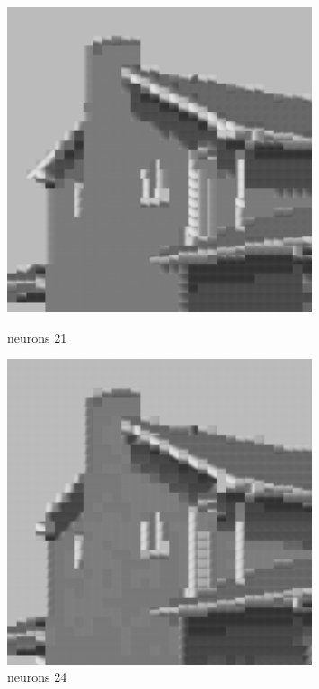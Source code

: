 \documentclass[../IDP_Task5_Karwowski_Kowalewski.tex]{subfiles}
\begin{document}
{{        \begin{figure}[!htbp]
            \begin{minipage}[c]{0.45\linewidth}
                \centering
                \includegraphics[width=0.8\textwidth]{img/kowalewski/crop_size_8_neurons_21.png}
                \caption{neurons 21}
            \end{minipage}\hfill
            \begin{minipage}[c]{0.45\linewidth}
                \centering
                \includegraphics[width=0.8\textwidth]{img/kowalewski/crop_size_8_neurons_24.png}
                \caption{neurons 24}
            \end{minipage}
        \end{figure}

}}
\end{document}
